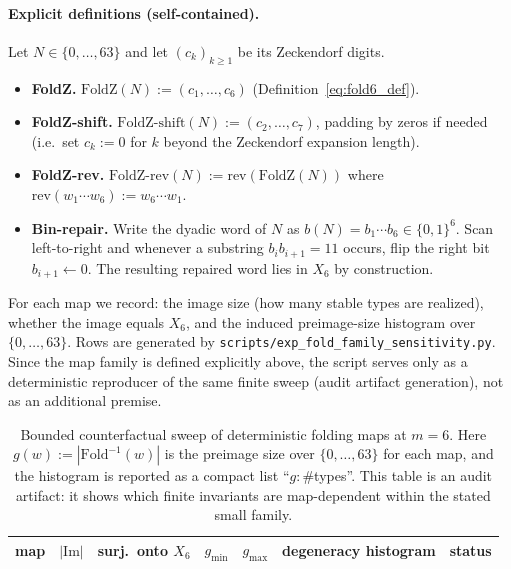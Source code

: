 \paragraph{Explicit definitions (self-contained).}
Let $N\in\{0,\ldots,63\}$ and let $(c_k)_{k\ge 1}$ be its Zeckendorf digits.
\begin{itemize}
  \item \textbf{FoldZ.} $\mathrm{FoldZ}(N):=(c_1,\ldots,c_6)$ (Definition~\eqref{eq:fold6_def}).
  \item \textbf{FoldZ-shift.} $\mathrm{FoldZ\mbox{-}shift}(N):=(c_2,\ldots,c_7)$, padding by zeros if needed
  (i.e.\ set $c_k:=0$ for $k$ beyond the Zeckendorf expansion length).
  \item \textbf{FoldZ-rev.} $\mathrm{FoldZ\mbox{-}rev}(N):=\mathrm{rev}(\mathrm{FoldZ}(N))$ where
  $\mathrm{rev}(w_1\cdots w_6):=w_6\cdots w_1$.
  \item \textbf{Bin-repair.} Write the dyadic word of $N$ as
  $b(N)=b_1\cdots b_6\in\{0,1\}^6$.
  Scan left-to-right and whenever a substring $b_i b_{i+1}=11$ occurs, flip the right bit $b_{i+1}\leftarrow 0$.
  The resulting repaired word lies in $X_6$ by construction.
\end{itemize}

For each map we record: the image size (how many stable types are realized), whether the image equals $X_6$, and the induced preimage-size histogram over $\{0,\dots,63\}$.
Rows are generated by \texttt{scripts/exp\_fold\_family\_sensitivity.py}.
Since the map family is defined explicitly above, the script serves only as a deterministic reproducer of the same finite sweep (audit artifact generation), not as an additional premise.

\begin{table}[H]
\centering
\scriptsize
\setlength{\tabcolsep}{6pt}
\renewcommand{\arraystretch}{1.15}
\begin{tabular}{lrrrrll}
\toprule
map & $|\mathrm{Im}|$ & surj.\ onto $X_6$ & $g_{\min}$ & $g_{\max}$ & degeneracy histogram & status \\
\midrule
%
\end{tabular}
\caption{Bounded counterfactual sweep of deterministic folding maps at $m=6$.
Here $g(w):=|\mathrm{Fold}^{-1}(w)|$ is the preimage size over $\{0,\dots,63\}$ for each map, and the histogram is reported as a compact list ``$g:\#$types''.
This table is an audit artifact: it shows which finite invariants are map-dependent within the stated small family.}
\label{tab:fold_family_sensitivity}
\end{table}

